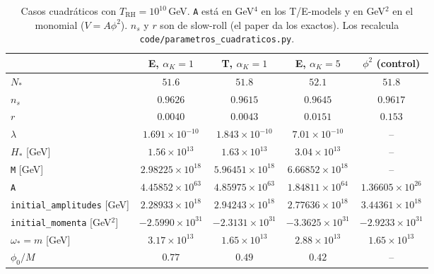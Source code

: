 \documentclass[11pt]{article}
\begin{document}
            \begin{table}[H]
                \centering
                \begin{tabular}{lcccc}
                    \toprule
                    & E, $\alpha_K = 1$ & T, $\alpha_K = 1$ & E, $\alpha_K = 5$ & $\phi^2$ (control) \\
                    \midrule
                    $N_*$ & $51.6$ & $51.8$ & $52.1$ & $51.8$ \\
                    $n_s$ & $0.9626$ & $0.9615$ & $0.9645$ & $0.9617$ \\
                    $r$ & $0.0040$ & $0.0043$ & $0.0151$ & $0.153$ \\
                    $\lambda$ & $1.691 \times 10^{-10}$ & $1.843 \times 10^{-10}$ & $7.01 \times 10^{-10}$ & -- \\
                    $H_*$ [GeV] & $1.56 \times 10^{13}$ & $1.63 \times 10^{13}$ & $3.04 \times 10^{13}$ & -- \\
                    \midrule
                    \texttt{M} [GeV] & $2.98225 \times 10^{18}$ & $5.96451 \times 10^{18}$ & $6.66852 \times 10^{18}$ & -- \\
                    \texttt{A} & $4.45852 \times 10^{63}$ & $4.85975 \times 10^{63}$ & $1.84811 \times 10^{64}$ & $1.36605 \times 10^{26}$ \\
                    \texttt{initial\_amplitudes} [GeV] & $2.28933 \times 10^{18}$ & $2.94243 \times 10^{18}$ & $2.77636 \times 10^{18}$ & $3.44361 \times 10^{18}$ \\
                    \texttt{initial\_momenta} [GeV$^2$] & $-2.5990 \times 10^{31}$ & $-2.3131 \times 10^{31}$ & $-3.3625 \times 10^{31}$ & $-2.9233 \times 10^{31}$ \\
                    $\omega_* = m$ [GeV] & $3.17 \times 10^{13}$ & $1.65 \times 10^{13}$ & $2.88 \times 10^{13}$ & $1.65 \times 10^{13}$ \\
                    $\phi_0/M$ & $0.77$ & $0.49$ & $0.42$ & -- \\
                    \bottomrule
                \end{tabular}
                \caption{Casos cuadráticos con $T_{\text{RH}} = 10^{10}$\,GeV. \texttt{A} está en GeV$^4$ en los T/E-models y en GeV$^2$ en el monomial ($V = A\phi^2$). $n_s$ y $r$ son de slow-roll (el paper da los exactos). Los recalcula \texttt{code/parametros\_cuadraticos.py}.}
                \label{tab:parametros-cuadraticos}
            \end{table}
\end{document}
